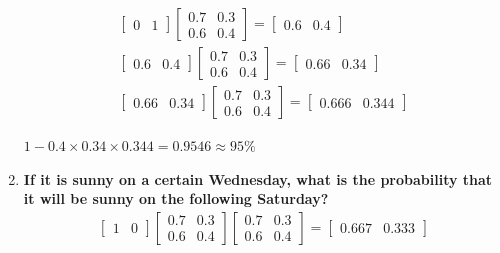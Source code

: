 \documentclass[a4paper]{article}
\begin{document}
\begin{enumerate}
	\begin{equation}
	\begin{aligned}
		\begin{bmatrix} 0& 1 \end{bmatrix}
		\begin{bmatrix} 0.7& 0.3 \\ 0.6& 0.4 \end{bmatrix} = 
		\begin{bmatrix} 0.6& 0.4 \end{bmatrix} \\
		\begin{bmatrix} 0.6& 0.4 \end{bmatrix} \begin{bmatrix} 0.7& 0.3 \\ 0.6& 0.4 \end{bmatrix} = \begin{bmatrix} 0.66& 0.34 \end{bmatrix} \\
		 \begin{bmatrix} 0.66& 0.34 \end{bmatrix}\begin{bmatrix} 0.7& 0.3 \\ 0.6& 0.4 \end{bmatrix} = \begin{bmatrix} 0.666& 0.344 \end{bmatrix} 
	\end{aligned}
	\end{equation}

	$1-0.4 \times 0.34 \times 0.344 = 0.9546 \approx 95\%$ 

	\item \textbf{If it is sunny on a certain Wednesday, what is the probability that it will be sunny on the following Saturday?
	}\\

	\begin{equation}
	\begin{aligned}
	\begin{bmatrix} 1& 0 \end{bmatrix}\begin{bmatrix} 0.7& 0.3 \\ 0.6& 0.4 \end{bmatrix} 
	\begin{bmatrix} 0.7& 0.3 \\ 0.6& 0.4 \end{bmatrix} = \begin{bmatrix} 0.667& 0.333 \end{bmatrix} 
	\end{aligned}
	\end{equation}


\end{enumerate}
\end{document}
